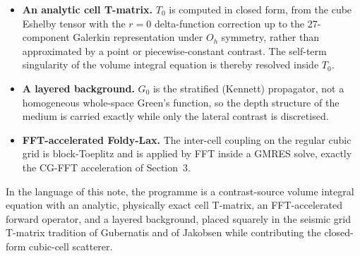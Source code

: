 \documentclass[11pt,a4paper]{article}
\begin{document}
\begin{itemize}
\item \textbf{An analytic cell T-matrix.} $T_0$ is computed in closed form, from the cube
Eshelby tensor with the $r=0$ delta-function correction up to the 27-component Galerkin
representation under $O_h$ symmetry, rather than approximated by a point or piecewise-constant
contrast. The self-term singularity of the volume integral equation is thereby resolved inside
$T_0$.
\item \textbf{A layered background.} $G_0$ is the stratified (Kennett) propagator, not a
homogeneous whole-space Green's function, so the depth structure of the medium is carried
exactly while only the lateral contrast is discretised.
\item \textbf{FFT-accelerated Foldy-Lax.} The inter-cell coupling on the regular cubic grid is
block-Toeplitz and is applied by FFT inside a GMRES solve, exactly the CG-FFT acceleration of
Section~3.
\end{itemize}

In the language of this note, the programme is a contrast-source volume integral equation with
an analytic, physically exact cell T-matrix, an FFT-accelerated forward operator, and a layered
background, placed squarely in the seismic grid T-matrix tradition of Gubernatis and of Jakobsen
while contributing the closed-form cubic-cell scatterer.



\end{document}
